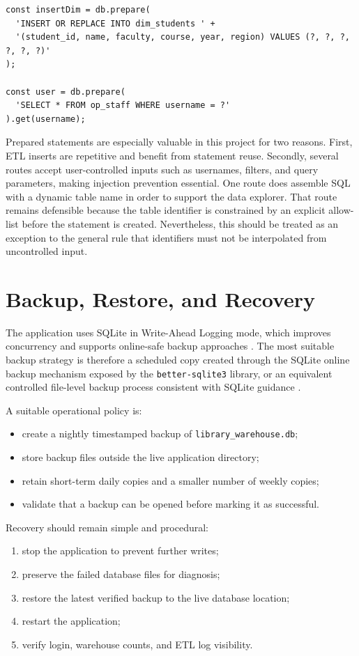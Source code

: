 \documentclass[12pt,a4paper]{article}
\begin{document}
\begin{lstlisting}[style=reportcode,caption={Prepared statement examples from ETL and reporting code}]
const insertDim = db.prepare(
  'INSERT OR REPLACE INTO dim_students ' +
  '(student_id, name, faculty, course, year, region) VALUES (?, ?, ?, ?, ?, ?)'
);

const user = db.prepare(
  'SELECT * FROM op_staff WHERE username = ?'
).get(username);
\end{lstlisting}

Prepared statements are especially valuable in this project for two reasons. First, ETL inserts are repetitive and benefit from statement reuse. Secondly, several routes accept user-controlled inputs such as usernames, filters, and query parameters, making injection prevention essential. One route does assemble SQL with a dynamic table name in order to support the data explorer. That route remains defensible because the table identifier is constrained by an explicit allow-list before the statement is created. Nevertheless, this should be treated as an exception to the general rule that identifiers must not be interpolated from uncontrolled input.

\section{Backup, Restore, and Recovery}
The application uses SQLite in Write-Ahead Logging mode, which improves concurrency and supports online-safe backup approaches \citep{sqliteWal}. The most suitable backup strategy is therefore a scheduled copy created through the SQLite online backup mechanism exposed by the \texttt{better-sqlite3} library, or an equivalent controlled file-level backup process consistent with SQLite guidance \citep{sqliteBackup}.

A suitable operational policy is:
\begin{itemize}
  \item create a nightly timestamped backup of \texttt{library\_warehouse.db};
  \item store backup files outside the live application directory;
  \item retain short-term daily copies and a smaller number of weekly copies;
  \item validate that a backup can be opened before marking it as successful.
\end{itemize}

Recovery should remain simple and procedural:
\begin{enumerate}
  \item stop the application to prevent further writes;
  \item preserve the failed database files for diagnosis;
  \item restore the latest verified backup to the live database location;
  \item restart the application;
  \item verify login, warehouse counts, and ETL log visibility.
\end{enumerate}
\end{document}
